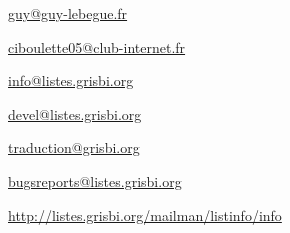 \urldef{\urlGuyLebegueEmail}%
\url{guy@guy-lebegue.fr}     %

\urldef{\urlMicheleBondilEmail}%
\url{ciboulette05@club-internet.fr}     %

\urldef{\urlListInfoEmail}%
\url{info@listes.grisbi.org}     %

\urldef{\urlListDevelEmail}%
\url{devel@listes.grisbi.org}     %

\urldef{\urlListTraductionEmail}%
\url{traduction@grisbi.org}  %

\urldef{\urlListBugsreport}%
\url{bugsreports@listes.grisbi.org}     %

\urldef{\urlListSF}%
\url{http://listes.grisbi.org/mailman/listinfo/info}     %


